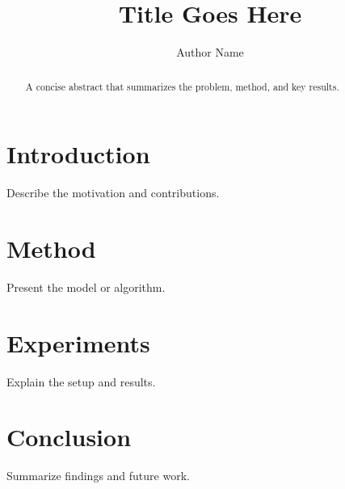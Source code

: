 \documentclass[11pt]{article}
\title{Title Goes Here}
\author{Author Name}
\date{}
\begin{document}
\maketitle

\begin{abstract}
A concise abstract that summarizes the problem, method, and key results.
\end{abstract}

\section{Introduction}
Describe the motivation and contributions.

\section{Method}
Present the model or algorithm.

\section{Experiments}
Explain the setup and results.

\section{Conclusion}
Summarize findings and future work.



\end{document}
